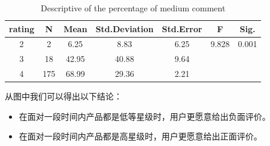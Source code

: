 \documentclass{mcmthesis}
\begin{document}
\begin{table}[htb]
	\center
	\caption{Descriptive of the percentage of medium comment}
	\label{type}
	\begin{tabular}{c|c|c|c|c|c|c}
		\hline
		\textbf{rating} & \textbf{N} & \textbf{Mean}& \textbf{Std.Deviation}& \textbf{Std.Error}& \textbf{F}& \textbf{Sig.} \\ \hline 
		2        & 2             & 6.25           & 8.83         & 6.25    & 9.828 & 0.001    \\
		3          & 18           & 42.95           & 40.88         & 9.64    &  & \\
		4            & 175         & 68.99           & 29.36         & 2.21    &  & \\ \hline
	\end{tabular}
\end{table}

从图中我们可以得出以下结论：
\begin{itemize}
	\item 在面对一段时间内产品都是低等星级时，用户更愿意给出负面评价。
	\item 在面对一段时间内产品都是高星级时，用户更愿意给出正面评价。
\end{itemize}
\end{document}
